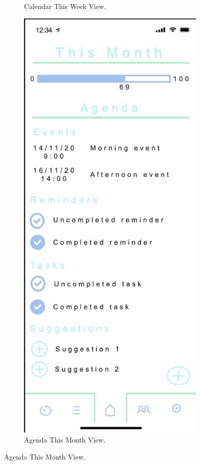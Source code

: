 \begin{figure}[H]
\begin{subfigure}[b]{0.3\textwidth}
        \caption{Calendar This Week View.}
        \label{fig:calendar_this_week_colour}
    \end{subfigure}
    \hfill
    \begin{subfigure}[b]{0.3\textwidth}
        \centering
        \includegraphics[width=\textwidth]{./graphics/design/Dashboard - Agenda View - This Month.png}
        \caption{Agenda This Month View.}
        \label{fig:agenda_this_month_colour}
    \end{subfigure}
    

\end{figure}
